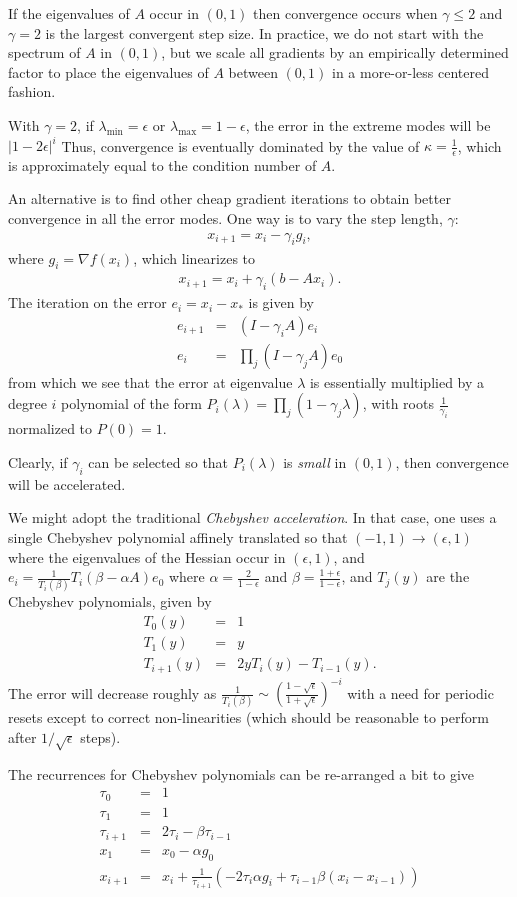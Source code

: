 \documentclass{article}
\newcommand{\beas}{\begin{eqnarray*}}
\newcommand{\enas}{\end{eqnarray*}}
\begin{document}
If the eigenvalues of $A$ occur in $(0,1)$ then convergence
occurs when $\gamma \le 2$ and $\gamma = 2$ is the largest convergent
step size.
In practice, we do not start with the spectrum of $A$ in $(0,1)$,
but we scale all gradients by an empirically determined factor to place
the eigenvalues of $A$ between $(0,1)$ in a more-or-less centered
fashion.

With $\gamma = 2$, if $\lambda_{\min} = \epsilon$ or
$\lambda_{\max} = 1-\epsilon$,
the error in the extreme modes will be $|1 - 2 \epsilon|^i$
Thus, convergence is eventually dominated
by the value of $\kappa = \frac{1}{\epsilon}$,
which is approximately equal to the condition number of $A$.

An alternative is to find other cheap gradient iterations
to obtain better convergence in all the error modes.  One way
is to vary the step length, $\gamma$:
\beas
  x_{i+1} = x_i - \gamma_i g_i,
\enas
where $g_i = \nabla f(x_i)$, which linearizes to
\beas
  x_{i+1} = x_i + \gamma_i (b - A x_i).
\enas
The iteration on the error $e_i = x_i - x_*$ is given by
\beas
  e_{i+1} &=& (I - \gamma_i A) e_i\\
  e_{i} &=& \prod_j (I - \gamma_j A) e_0
\enas
from which we see that the error at eigenvalue $\lambda$
is essentially multiplied by a degree $i$ polynomial of the form
$P_i(\lambda) = \prod_j (1 - \gamma_j \lambda)$, with roots
$\frac{1}{\gamma_i}$ normalized to $P(0) = 1$.

Clearly, if $\gamma_i$ can be selected so that $P_i(\lambda)$
is {\em small} in $(0,1)$,
then convergence will be accelerated.

We might adopt the traditional {\em Chebyshev acceleration}.
In that case, one uses a single Chebyshev polynomial affinely
translated so that $(-1,1)\rightarrow (\epsilon,1)$ where the
eigenvalues of the Hessian occur in $(\epsilon,1)$, and $e_i =
\frac{1}{T_i(\beta)} T_i(\beta - \alpha A) e_0$ where $\alpha =
\frac{2}{1-\epsilon}$ and $\beta = \frac{1+\epsilon}{1-\epsilon}$,
and $T_j(y)$ are the Chebyshev polynomials, given by
\beas
  T_0(y) &=& 1\\
  T_1(y) &=& y\\
  T_{i+1}(y) &=& 2 y T_{i}(y) - T_{i-1}(y).
\enas
The error will decrease roughly as
$\frac{1}{T_i(\beta)}
\sim \left(\frac{1-\sqrt{\epsilon}}{1+\sqrt{\epsilon}}\right)^{-i}$
with a need for periodic resets except to correct non-linearities
(which should be reasonable to perform after $1/\sqrt{\epsilon}$ steps).

The recurrences for Chebyshev polynomials can be re-arranged a bit to
give
\beas
\tau_0 &=& 1\\
\tau_1 &=& 1\\
\tau_{i+1} &=& 2 \tau_i - \beta \tau_{i-1}\\
x_1 &=& x_0 - \alpha g_0\\
x_{i+1} &=& x_{i} +
\frac{1}{\tau_{i+1}}\left( -2 \tau_i \alpha g_i+\tau_{i-1} \beta (x_i-x_{i-1})\right)
\enas
\end{document}
